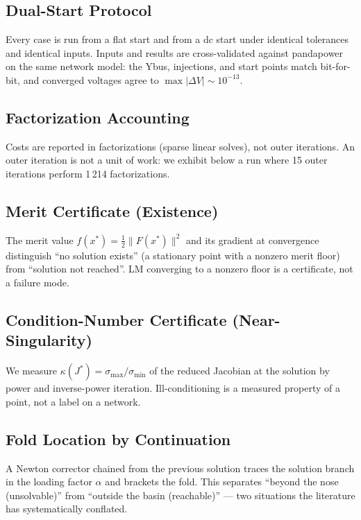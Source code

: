 \documentclass[11pt]{article}
\begin{document}
\subsection{Dual-Start Protocol}

Every case is run from a flat start and from a dc start under identical
tolerances and identical inputs. Inputs and results are cross-validated
against pandapower~\cite{pandapower2018} on the same network model: the
Ybus, injections, and start points match bit-for-bit, and converged
voltages agree to $\max|\Delta V| \sim 10^{-13}$.

\subsection{Factorization Accounting}

Costs are reported in factorizations (sparse linear solves), not outer
iterations. An outer iteration is not a unit of work: we exhibit below a
run where 15 outer iterations perform 1\,214 factorizations.

\subsection{Merit Certificate (Existence)}

The merit value $f(x^*) = \tfrac12\|F(x^*)\|^2$ and its gradient at
convergence distinguish ``no solution exists'' (a stationary point with a
nonzero merit floor) from ``solution not reached''. LM converging to a
nonzero floor is a certificate, not a failure mode.

\subsection{Condition-Number Certificate (Near-Singularity)}

We measure $\kappa(J^*) = \sigma_{\max}/\sigma_{\min}$ of the reduced
Jacobian at the solution by power and inverse-power iteration.
Ill-conditioning is a measured property of a point, not a label on a
network.

\subsection{Fold Location by Continuation}

A Newton corrector chained from the previous solution traces the solution
branch in the loading factor $\alpha$ and brackets the fold. This
separates ``beyond the nose (unsolvable)'' from ``outside the basin
(reachable)'' --- two situations the literature has systematically
conflated.
\end{document}
